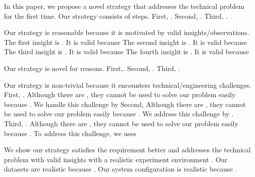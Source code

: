 In this paper, we propose a novel strategy \blank{} that addresses the technical problem \blank{} for the first time. Our strategy consists of \blank{} steps. First, \blank{}. Second, \blank{}. Third, \blank{}.


Our strategy is reasonable because it is motivated by \blank{} valid insights/observations.  The first insight is \blank{}. It is valid because   The second insight is \blank{}. It is valid because  The third insight is \blank{}. It is valid because  The fourth insight is \blank{}. It is valid because  


Our strategy is novel for \blank{} reasons. First,. Second, . Third, . 


Our strategy is non-trivial because it encounters \blank{} technical/engineering challenges.  First, . Although there are , they cannot be used to solve our problem easily because \blank{}. We handle this challenge by  Second,  Although there are , they cannot be used to solve our problem easily because \blank{}. We address this challenge by  . Third, . Although there are , they cannot be used to solve our problem easily because \blank{}. To address this challenge, we uses 

We show our strategy satisfies the requirement better and addresses the technical problem with valid insights with a realistic experiment environment \blank{}. Our datasets are realistic because \blank{}. Our system configuration is realistic because \blank{}. 

